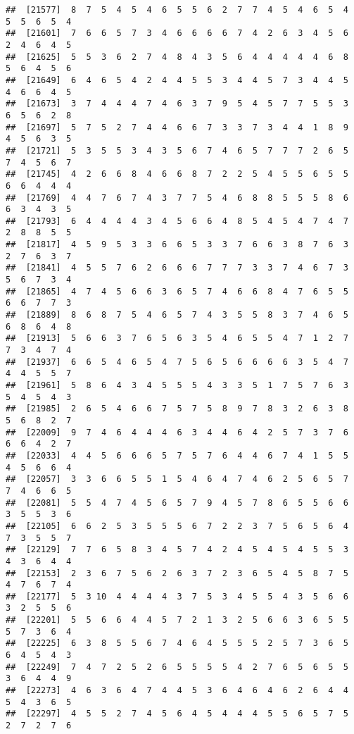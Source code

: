 \documentclass[
]{book}
\begin{document}
\begin{verbatim}
##  [21577]  8  7  5  4  5  4  6  5  5  6  2  7  7  4  5  4  6  5  4  5  5  6  5  4
##  [21601]  7  6  6  5  7  3  4  6  6  6  6  7  4  2  6  3  4  5  6  2  4  6  4  5
##  [21625]  5  5  3  6  2  7  4  8  4  3  5  6  4  4  4  4  4  6  8  5  6  4  5  6
##  [21649]  6  4  6  5  4  2  4  4  5  5  3  4  4  5  7  3  4  4  5  4  6  6  4  5
##  [21673]  3  7  4  4  4  7  4  6  3  7  9  5  4  5  7  7  5  5  3  6  5  6  2  8
##  [21697]  5  7  5  2  7  4  4  6  6  7  3  3  7  3  4  4  1  8  9  4  5  6  3  5
##  [21721]  5  3  5  5  3  4  3  5  6  7  4  6  5  7  7  7  2  6  5  7  4  5  6  7
##  [21745]  4  2  6  6  8  4  6  6  8  7  2  2  5  4  5  5  6  5  5  6  6  4  4  4
##  [21769]  4  4  7  6  7  4  3  7  7  5  4  6  8  8  5  5  5  8  6  6  3  4  3  5
##  [21793]  6  4  4  4  4  3  4  5  6  6  4  8  5  4  5  4  7  4  7  2  8  8  5  5
##  [21817]  4  5  9  5  3  3  6  6  5  3  3  7  6  6  3  8  7  6  3  2  7  6  3  7
##  [21841]  4  5  5  7  6  2  6  6  6  7  7  7  3  3  7  4  6  7  3  5  6  7  3  4
##  [21865]  4  7  4  5  6  6  3  6  5  7  4  6  6  8  4  7  6  5  5  6  6  7  7  3
##  [21889]  8  6  8  7  5  4  6  5  7  4  3  5  5  8  3  7  4  6  5  6  8  6  4  8
##  [21913]  5  6  6  3  7  6  5  6  3  5  4  6  5  5  4  7  1  2  7  7  3  4  7  4
##  [21937]  6  6  5  4  6  5  4  7  5  6  5  6  6  6  6  3  5  4  7  4  4  5  5  7
##  [21961]  5  8  6  4  3  4  5  5  5  4  3  3  5  1  7  5  7  6  3  5  4  5  4  3
##  [21985]  2  6  5  4  6  6  7  5  7  5  8  9  7  8  3  2  6  3  8  5  6  8  2  7
##  [22009]  9  7  4  6  4  4  4  6  3  4  4  6  4  2  5  7  3  7  6  6  6  4  2  7
##  [22033]  4  4  5  6  6  6  5  7  5  7  6  4  4  6  7  4  1  5  5  4  5  6  6  4
##  [22057]  3  3  6  6  5  5  1  5  4  6  4  7  4  6  2  5  6  5  7  7  4  6  6  5
##  [22081]  5  5  4  7  4  5  6  5  7  9  4  5  7  8  6  5  5  6  6  3  5  5  3  6
##  [22105]  6  6  2  5  3  5  5  5  6  7  2  2  3  7  5  6  5  6  4  7  3  5  5  7
##  [22129]  7  7  6  5  8  3  4  5  7  4  2  4  5  4  5  4  5  5  3  4  3  6  4  4
##  [22153]  2  3  6  7  5  6  2  6  3  7  2  3  6  5  4  5  8  7  5  4  7  6  7  4
##  [22177]  5  3 10  4  4  4  4  3  7  5  3  4  5  5  4  3  5  6  6  3  2  5  5  6
##  [22201]  5  5  6  6  4  4  5  7  2  1  3  2  5  6  6  3  6  5  5  5  7  3  6  4
##  [22225]  6  3  8  5  5  6  7  4  6  4  5  5  5  2  5  7  3  6  5  6  4  5  4  3
##  [22249]  7  4  7  2  5  2  6  5  5  5  5  4  2  7  6  5  6  5  5  3  6  4  4  9
##  [22273]  4  6  3  6  4  7  4  4  5  3  6  4  6  4  6  2  6  4  4  5  4  3  6  5
##  [22297]  4  5  5  2  7  4  5  6  4  5  4  4  4  5  5  6  5  7  5  2  7  2  7  6

\end{verbatim}
\end{document}

